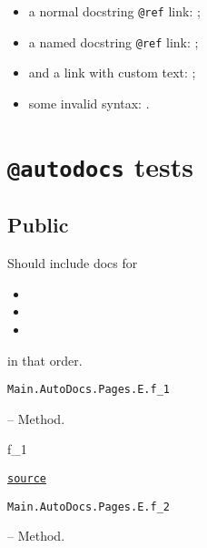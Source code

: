 \begin{itemize}
\item a normal docstring \texttt{@ref} link: ;


\item a named docstring \texttt{@ref} link: ;


\item and a link with custom text: ;


\item some invalid syntax: .

\end{itemize}


\chapter{\texttt{@autodocs} tests}



\label{11910521728371484862}{}




\section{Public}



\label{1292728206705221544}{}


Should include docs for



\begin{itemize}
\item {}


\item {}


\item {}

\end{itemize}


in that order.


\hypertarget{2996493907818938116}{\texttt{Main.AutoDocs.Pages.E.f\_1}}  -- {Method.}

\begin{adjustwidth}{2em}{0pt}

f\_1



\href{https://github.com/BambOoxX/Documenter.jl/blob/d157febde213549ed0d45c894f0651560da477d3/test/examples/pages/e.jl#L5}{\texttt{source}}


\end{adjustwidth}
\hypertarget{6076055157300971596}{\texttt{Main.AutoDocs.Pages.E.f\_2}}  -- {Method.}

